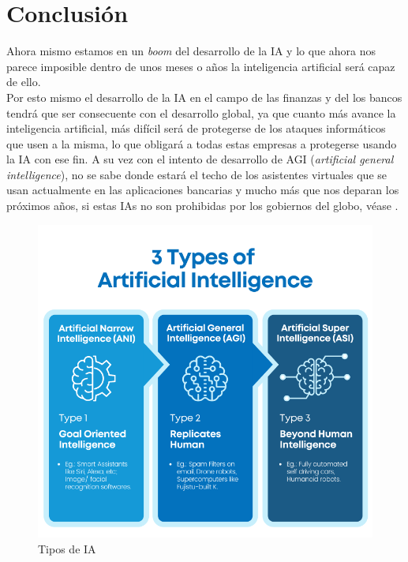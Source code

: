 \documentclass[12pt, a4paper]{report}
\begin{document}
\chapter{Conclusión}
Ahora mismo estamos en un \textit{boom} del desarrollo de la IA y lo que ahora nos parece imposible dentro de unos meses o años la inteligencia artificial será capaz de ello.\\
\newline
\newline
Por esto mismo el desarrollo de la IA en el campo de las finanzas y del los bancos tendrá que ser consecuente con el desarrollo global, ya que cuanto más avance la inteligencia artificial, más difícil será de protegerse de los ataques informáticos que usen a la misma, lo que obligará a todas estas empresas a protegerse usando la IA con ese fin.
\newline
\newline
A su vez con el intento de desarrollo de AGI (\textit{artificial general intelligence}), no se sabe donde estará el techo de los asistentes virtuales que se usan actualmente en las aplicaciones bancarias y mucho más que nos deparan los próximos años, si estas IAs no son prohibidas por los gobiernos del globo, véase \cite{ban}.
\begin{figure}[H]
	\centering
	\includegraphics[scale=0.37]{agi}
	\caption{Tipos de IA}
	\label{Tipos de IA}
\end{figure}
\end{document}
